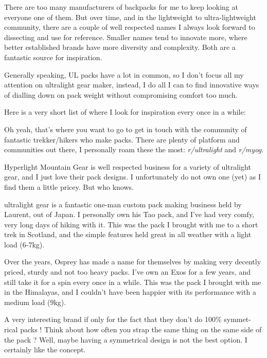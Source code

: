 There are too many manufacturers of backpacks for me to keep looking at everyone one of them. But over time, and in the lightweight to ultra-lightweight community, there are a couple of well respected names I always look forward to dissecting and use for reference. Smaller names tend to innovate more, where better established brands have more diversity and complexity. Both are a fantastic source for inspiration.

Generally speaking, UL packs have a lot in common, so I don’t focus all my attention on ultralight gear maker, instead, I do all I can to find innovative ways of dialling down on pack weight without compromising comfort too much.

Here is a very short list of where I look for inspiration every once in a while:

\begin{description}

  \item [Reddit] Oh yeah, that’s where you want to go to get in touch with the community of fantastic trekker/hikers who make packs. There are plenty of platform and communities out there, I personally roam these the most: \textit{r/ultralight} and \textit{r/myog}.

  \item [HMG] Hyperlight Mountain Gear is well respected business for a variety of ultralight gear, and I just love their pack designs. I unfortunately do not own one (yet) as I find them a little pricey. But who knows.

  \item [KS (Kinpu San)] ultralight gear is a fantastic one-man custom pack making business held by Laurent, out of Japan. I personally own his Tao pack, and I’ve had very comfy, very long days of hiking with it. This was the pack I brought with me to a short trek in Scotland, and the simple features held great in all weather with a light load (6-7kg).

  \item [Osprey] Over the years, Osprey has made a name for themselves by making very decently priced, sturdy and not too heavy packs. I’ve own an Exos for a few years, and still take it for a spin every once in a while. This was the pack I brought with me in the Himalayas, and I couldn’t have been happier with its performance with a medium load (9kg).
  \item [Sierra Design] A very interesting brand if only for the fact that they don’t do 100\% symmet- rical packs ! Think about how often you strap the same thing on the same side of the pack ? Well, maybe having a symmetrical design is not the best option. I certainly like the concept.


\end{description}
